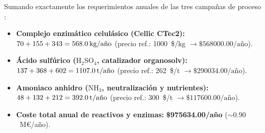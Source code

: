 \documentclass{report}
\begin{document}
\begin{tcolorbox}[colback=blue!5!white,colframe=blue!75!black,title=\textbf{Consumos Anuales Agregados de Insumos Químicos y Enzimáticos ($\text{B-5}^* = \SI{120000}{\tonne\text{ b.s.}/a\text{\~{n}}o}$)}]
    Sumando exactamente los requerimientos anuales de las tres campañas de proceso \autocite[Tabla~5 y Tabla~8]{Jafari-Gohargan2026}:
    \begin{itemize}
        \item \textbf{Complejo enzimático celulásico (Cellic CTec2):} $70 + 155 + 343 = \textbf{\SI{568.0}{\kilo\gram/a\text{\~{n}}o}}$ (precio ref.: \num{1000}~\$/kg $\rightarrow \$\num{568000.00}/\text{año}$).
        \item \textbf{Ácido sulfúrico ($\mathrm{H_2SO_4}$, catalizador organosolv):} $137 + 368 + 602 = \textbf{\SI{1107.0}{\tonne/a\text{\~{n}}o}}$ (precio ref.: \num{262}~\$/t $\rightarrow \$\num{290034.00}/\text{año}$).
        \item \textbf{Amoniaco anhidro ($\mathrm{NH_3}$, neutralización y nutrientes):} $48 + 132 + 212 = \textbf{\SI{392.0}{\tonne/a\text{\~{n}}o}}$ (precio ref.: \num{300}~\$/t $\rightarrow \$\num{117600.00}/\text{año}$).
        \item \textbf{Coste total anual de reactivos y enzimas:} \textbf{\$\num{975634.00}/año} ($\sim \num{0.90}$~M€/año).
    \end{itemize}
\end{tcolorbox}
\end{document}

